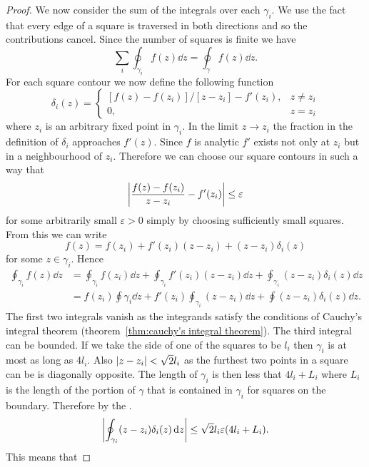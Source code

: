 \documentclass{article}
\begin{document}
\begin{proof}
        We now consider the sum of the integrals over each \(\gamma_i\).
        We use the fact that every edge of a square is traversed in both directions and so the contributions cancel.
        Since the number of squares is finite we have
        \[\sum_{i}\oint_{\gamma_i} f(z)\dd{z} = \oint_{\gamma} f(z) \dd{z}.\]
        For each square contour we now define the following function
        \[
            \delta_i(z) = 
            \begin{cases}
                [f(z) - f(z_i)]/[z - z_i] - f'(z_i), & z \ne z_i\\
                0, & z = z_i
            \end{cases}
        \]
        where \(z_i\) is an arbitrary fixed point in \(\gamma_i\).
        In the limit \(z\to z_i\) the fraction in the definition of \(\delta_i\) approaches \(f'(z)\).
        Since \(f\) is analytic \(f'\) exists not only at \(z_i\) but in a neighbourhood of \(z_i\).
        Therefore we can choose our square contours in such a way that
        \[\abs{\frac{f(z) - f(z_i)}{z - z_i} - f'(z_i)}\le \varepsilon\]
        for some arbitrarily small \(\varepsilon>0\) simply by choosing sufficiently small squares.
        From this we can write
        \[f(z) = f(z_i) + f'(z_i)(z - z_i) + (z - z_i)\delta_i(z)\]
        for some \(z\in\gamma_i\).
        Hence
        \begin{align*}
            \oint_{\gamma_i} f(z)\dd{z} &= \oint_{\gamma_i} f(z_i)\dd{z} + \oint_{\gamma_i} f'(z_i)(z - z_i)\dd{z} + \oint_{\gamma_i} (z - z_i)\delta_i(z) \dd{z}\\
            &= f(z_i)\oint\gamma_i \dd{z} + f'(z_i)\oint_{\gamma_i}(z - z_i)\dd{z} + \oint(z - z_i)\delta_i(z)\dd{z}.
        \end{align*}
        The first two integrals vanish as the integrands satisfy the conditions of Cauchy's integral theorem (theorem~\ref{thm:cauchy's integral theorem}).
        The third integral can be bounded.
        If we take the side of one of the squares to be \(l_i\) then \(\gamma_i\) is at most as long as \(4l_i\).
        Also \(\abs{z - z_i} < \sqrt{2}l_i\) as the furthest two points in a square can be is diagonally opposite.
        The length of \(\gamma_i\) is then less that \(4l_i + L_i\) where \(L_i\) is the length of the portion of \(\gamma\) that is contained in \(\gamma_i\) for squares on the boundary.
        Therefore by the .
        \[\abs{\oint_{\gamma_i} (z - z_i)\delta_i(z)\dd{z}} \le \sqrt{2}l_i\varepsilon(4l_i + L_i).\]
        This means that

\end{proof}
\end{document}
